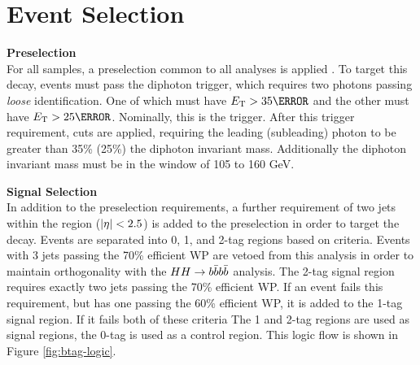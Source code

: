 \section{Event Selection} \label{sec:yybb-event-selection}
\noindent\textbf{Preselection}\\
\indent For all samples, a preselection common to all \Hgg analyses is applied \cite{hgam-preselection}. To target this decay, events must pass the diphoton trigger, which requires two photons passing \textit{loose} identification. One of which must have $\et > \unit{35}{\GeV}$ and the other must have $\et > \unit{25}{\GeV}$. Nominally, this is the  trigger. After this trigger requirement, \pt cuts are applied, requiring the leading (subleading) photon \pt to be greater than 35\% (25\%) the diphoton invariant mass. Additionally the diphoton invariant mass must be in the window of 105 to 160 GeV.

\noindent\textbf{Signal Selection}\\
\indent In addition to the preselection requirements, a further requirement of two jets within the \btagging region ($|\eta| <2.5$) is added to the preselection in order to target the \Hbb decay. Events are separated into 0, 1, and 2-tag regions based on \btagging criteria. Events with 3 jets passing the 70\% efficient \btagging \gls{WP} are vetoed from this analysis in order to maintain orthogonality with the $HH \rightarrow b\bar{b} b\bar{b}$ analysis. The 2-tag signal region requires exactly two jets passing the 70\% efficient \btagging \gls{WP}. If an event fails this requirement, but has one \bjet passing the 60\% efficient \btagging \gls{WP}, it is added to the 1-tag signal region. If it fails both of these criteria The 1 and 2-tag regions are used as signal regions, the 0-tag is used as a control region. This logic flow is shown in Figure \ref{fig:btag-logic}.


